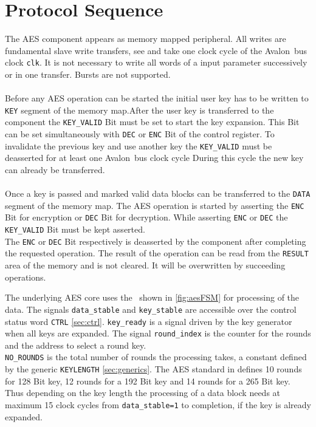 \documentclass{ruschidoc}
\begin{document}
\section{Protocol Sequence}
\label{sec:usage}
The AES component appears as memory mapped peripheral. All writes are fundamental slave write transfers, see \cite{Altera:Avalon} and take one 
clock cycle of the Avalon\rtm\ bus clock \texttt{clk}. It is not necessary to write all words of a input parameter successively or in one transfer. 
Bursts are not supported.\\
\\
Before any AES operation can be started the initial user key has to be written to
\texttt{KEY} segment of the memory map.After the user key is transferred
to the component the \texttt{KEY\_VALID} Bit must be set to start the key
expansion. This Bit can be set simultaneously with \texttt{DEC} or \texttt{ENC} Bit of
the control register. To invalidate the previous key and use another key the
\texttt{KEY\_VALID} must be deasserted for at least one Avalon\rtm\ bus clock cycle
During this cycle the new key can already be transferred.\\
\\
Once a key is passed and marked valid data blocks can be transferred to the
\texttt{DATA} segment of the memory map. 
The AES operation is started by asserting the \texttt{ENC} Bit for
encryption or \texttt{DEC} Bit for decryption. 
While asserting \texttt{ENC} or \texttt{DEC} the \texttt{KEY\_VALID} Bit must be
kept asserted.\\ 
The \texttt{ENC} or \texttt{DEC} Bit respectively is deasserted by the component
after completing the requested operation.
The result of the operation can be read from the \texttt{RESULT} area of the memory
and is not cleared. It will be overwritten by succeeding operations. 

The underlying AES core uses the \FSM\ shown in \ref{fig:aesFSM} for processing of
the data. The signals \texttt{data\_stable} and \texttt{key\_stable} are accessible
over the control status word \texttt{CTRL} \ref{sec:ctrl}. \texttt{key\_ready} is a
signal driven by the key generator when all keys are expanded. The signal
\texttt{round\_index} is the counter for the rounds and the address to select a
round key. \\
\texttt{NO\_ROUNDS} is the total number of rounds the processing takes, a constant
defined by the generic \texttt{KEYLENGTH} \ref{sec:generics}. The AES standard
in\cite{NIST:Fips197} defines 10 rounds for 128 Bit key, 12 rounds for a 192 Bit key
and 14 rounds for a 265 Bit key.\\
Thus depending on the key length the processing of a data block needs at maximum 15
clock cycles from \texttt{data\_stable=1} to completion, if the key is already expanded.
\end{document}

